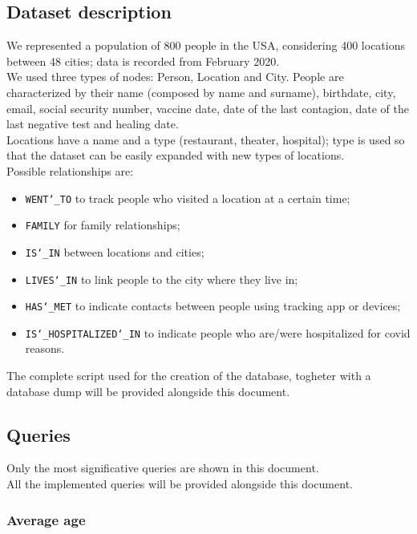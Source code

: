 \documentclass[12pt, a4paper]{article}
\begin{document}
\subsection{Dataset description}

We represented a population of 800 people in the USA, considering 400 locations
between 48 cities; data is recorded from February 2020.  \\ 
We used three types of nodes: Person, Location and City. 
People are characterized by their name (composed by name and surname), 
birthdate, city, email, social security number, vaccine date, date of the last 
contagion, date of the last negative test and healing date. \\
Locations have a name and a type (restaurant, theater, hospital); 
type is used so that the dataset can be easily expanded with new types of 
locations. \\
Possible relationships are: 
\begin{itemize}
    \item \texttt{WENT\char`_TO} to track people who visited a location at a 
        certain time;
	\item \texttt{FAMILY} for family relationships;
	\item \texttt{IS\char`_IN} between locations and cities;
	\item \texttt{LIVES\char`_IN} to link people to the city where they live in;
    \item \texttt{HAS\char`_MET} to indicate contacts between people using 
        tracking app or devices;
    \item \texttt{IS\char`_HOSPITALIZED\char`_IN} to indicate people who 
        are/were hospitalized for covid reasons.
\end{itemize}

\noindent %
The complete script used for the creation of the database, togheter with a 
database dump will be provided alongside this document.

\subsection{Queries}

Only the most significative queries are shown in this document. \\
All the implemented queries will be provided alongside this document.

\subsubsection{Average age}
\end{document}

